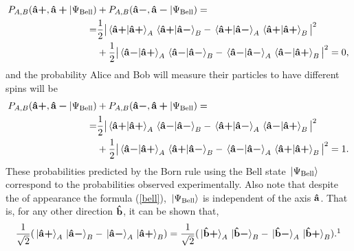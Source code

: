 {\begin{equation}
\begin{split}
    P_{A,B}(\uvbp{a},\uvbp{a}|\Psi_{\text{Bell}})&+P_{A,B}(\uvbm{a},\uvbm{a}|\Psi_{\text{Bell}})= \\
    =&\frac{1}{2}\big| \ip*{\uvbp{a}}{\uvbp{a}}_A\ip*{\uvbp{a}}{\uvbm{a}}_B-\ip*{\uvbp{a}}{\uvbm{a}}_A\ip*{\uvbp{a}}{\uvbp{a}}_B\big|^2\\
    &+\frac{1}{2}\big|\ip*{\uvbm{a}}{\uvbp{a}}_A\ip*{\uvbm{a}}{\uvbm{a}}_B-\ip*{\uvbm{a}}{\uvbm{a}}_A\ip*{\uvbm{a}}{\uvbp{a}}_B\big|^2=0,
\end{split}
\end{equation}
and the probability Alice and Bob will measure their particles to have different spins will be
\begin{equation}
\begin{split}
    P_{A,B}(\uvbp{a},\uvbm{a}|\Psi_{\text{Bell}})&+P_{A,B}(\uvbm{a},\uvbp{a}|\Psi_{\text{Bell}})= \\
    =&\frac{1}{2}\big| \ip*{\uvbp{a}}{\uvbp{a}}_A\ip*{\uvbm{a}}{\uvbm{a}}_B-\ip*{\uvbp{a}}{\uvbm{a}}_A\ip*{\uvbm{a}}{\uvbp{a}}_B\big|^2\\
    &+\frac{1}{2}\big|\ip*{\uvbm{a}}{\uvbp{a}}_A\ip*{\uvbp{a}}{\uvbm{a}}_B-\ip*{\uvbm{a}}{\uvbm{a}}_A\ip*{\uvbp{a}}{\uvbp{a}}_B\big|^2=1.
\end{split}
\end{equation}} 
These probabilities predicted by the Born rule using the Bell state $\ket*{\Psi_{\text{Bell}}}$ correspond to the probabilities observed experimentally. Also note that despite the of appearance the formula (\ref{bell}), $\ket*{\Psi_{\text{Bell}}}$ is independent of the axis $\vb{\hat{{a}}}$. That is, for any other direction $\vb{\hat{{b}}}$, it can be shown that,
\begin{equation}\label{bellstate2}\frac{1}{\sqrt{2}}(\ket*{\uvbp{a}}_A\ket*{\uvbm{a}}_B-\ket*{\uvbm{a}}_A\ket*{\uvbp{a}}_B)=\frac{1}{\sqrt{2}}(\ket*{\uvbp{b}}_A\ket*{\uvbm{b}}_B-\ket*{\uvbm{b}}_A\ket*{\uvbp{b}}_B).\protect\footnotemark\end{equation}
